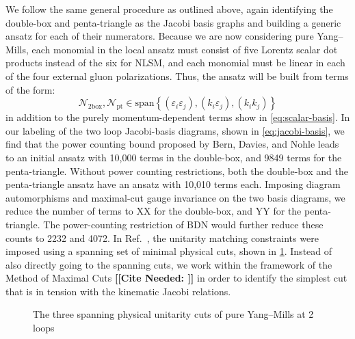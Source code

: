 \documentclass[11pt,letter]{article}
\def\be{\begin{equation}}
\def\ee{\end{equation}}
\newcommand{\citepls}[1]{{\bf\color{red}[[Cite Needed: #1]]}}
\begin{document}
We follow the same general procedure as outlined above, again
identifying the double-box and penta-triangle as the Jacobi basis
graphs and building a generic ansatz for each of their numerators.
Because we are now considering pure Yang--Mills, each monomial in the
local ansatz must consist of five Lorentz scalar dot products instead
of the six for NLSM, and each monomial must be linear in each of the
four external gluon polarizations.  Thus, the ansatz will be built
from terms of the form:
\be
\mathcal{N}_{\text{2box}},\mathcal{N}_{\text{pt}}\in \text{span}\left\{(\varepsilon_i \varepsilon_j) , (k_i \varepsilon_j), (k_ik_j)\right\}
\ee
in addition to the purely momentum-dependent terms show in
\cref{eq:scalar-basis}.  In our labeling of the two loop Jacobi-basis
diagrams, shown in \cref{eq:jacobi-basis}, we find that the power
counting bound proposed by Bern, Davies, and Nohle leads to an initial
ansatz with 10,000 terms in the double-box, and 9849 terms for the
penta-triangle.  Without power counting restrictions, both the
double-box and the penta-triangle ansatz have an ansatz with 10,010
terms each.  Imposing diagram automorphisms and maximal-cut gauge
invariance on the two basis diagrams, we reduce the number of terms to
XX for the double-box, and YY for the penta-triangle.  The
power-counting restriction of BDN would further reduce these counts to
2232 and 4072.  In Ref.~\cite{Bern:2015ooa}, the unitarity matching
constraints were imposed using a spanning set of minimal physical
cuts, shown in \cref{fig:ym-spanning}.  Instead of also directly going
to the spanning cuts, we work within the framework of the Method of
Maximal Cuts \citepls{} in order to identify the simplest cut that is
in tension with the kinematic Jacobi relations.

\begin{figure}
  \begin{center}
    \begin{subfigure}{0.3\textwidth}
      \begin{center}
        \LMCut
      \end{center}
    \end{subfigure}
    \begin{subfigure}{0.3\textwidth}
      \begin{center}
        \PhysicalCutOne{}{}{}{}
      \end{center}
    \end{subfigure}
    \begin{subfigure}{0.3\textwidth}
      \begin{center}
        \PhysicalCutTwo{}{}{}{}
      \end{center}
    \end{subfigure}
  \end{center}
  \caption{The three spanning physical unitarity cuts of pure
    Yang--Mills at 2 loops}
  \label{fig:ym-spanning}
\end{figure}
\end{document}
